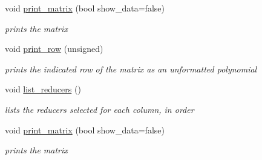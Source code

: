 \begin{Indent}
\begin{DoxyCompactItemize}
void \hyperlink{group___g_b_computation_a9f3e9b5617084c34f97acd23d6e67a43}{print\+\_\+matrix} (bool show\+\_\+data=false)
\begin{DoxyCompactList}\small\item\em prints the matrix \end{DoxyCompactList}\item 
\mbox{\label{group___g_b_computation_a11e756a43276426735929d09976d7337}} 
void \hyperlink{group___g_b_computation_a11e756a43276426735929d09976d7337}{print\+\_\+row} (unsigned)
\begin{DoxyCompactList}\small\item\em prints the indicated row of the matrix as an unformatted polynomial \end{DoxyCompactList}\item 
\mbox{\label{group___g_b_computation_af4491ffa78cb0e75051492b83f51744b}} 
void \hyperlink{group___g_b_computation_af4491ffa78cb0e75051492b83f51744b}{list\+\_\+reducers} ()
\begin{DoxyCompactList}\small\item\em lists the reducers selected for each column, in order \end{DoxyCompactList}\item 
void \hyperlink{group___g_b_computation_a9f3e9b5617084c34f97acd23d6e67a43}{print\+\_\+matrix} (bool show\+\_\+data=false)
\begin{DoxyCompactList}\small\item\em prints the matrix \end{DoxyCompactList}\end{DoxyCompactItemize}
\end{Indent}
